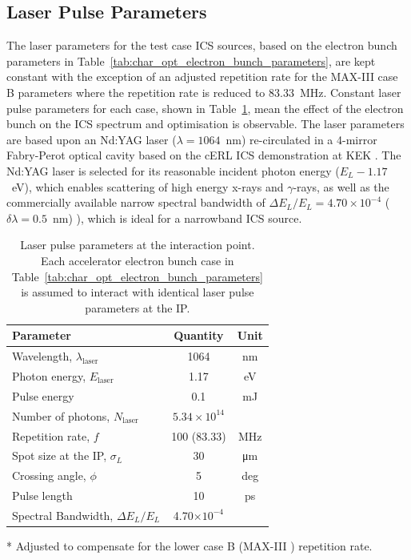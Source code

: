 \documentclass[../main.tex]{subfiles}
\begin{document}
\subsection{Laser Pulse Parameters}

The laser parameters for the test case ICS sources, based on the electron bunch parameters in Table~\ref{tab:char_opt_electron_bunch_parameters}, are kept constant with the exception of an adjusted repetition rate for the MAX-III case B parameters where the repetition rate is reduced to 83.33~\si{\mega\hertz}. Constant laser pulse parameters for each case, shown in Table~\ref{tab:char_opt_laser_pulse_parameters}, mean the effect of the electron bunch on the ICS spectrum and optimisation is observable. The laser parameters are based upon an Nd:YAG laser ($\lambda = 1064$~\si{\nano\meter}) re-circulated in a 4-mirror Fabry-Perot optical cavity based on the cERL ICS demonstration at KEK \cite{akagi2016narrow}. The Nd:YAG laser is selected for its reasonable incident photon energy ($E_{L}-1.17$~\si{\electronvolt}), which enables scattering of high energy x-rays and $\gamma$-rays, as well as the commercially available narrow spectral bandwidth of $\Delta E_{L}/E_{L} = 4.70\times 10^{-4}$  ($\delta\lambda = 0.5$~\si{\nano\meter}) \cite{thorlabs2021ndyag200}), which is ideal for a narrowband ICS source.

\begin{table}[!h]
\centering
\caption{Laser pulse parameters at the interaction point. Each accelerator electron bunch case in Table~\ref{tab:char_opt_electron_bunch_parameters} is assumed to interact with identical laser pulse parameters at the IP.}
\vspace{3mm}
\begin{threeparttable}
\begin{tabular}{lcc}
\hline\hline
Parameter & Quantity & Unit \\
\hline
Wavelength, $\lambda_\textrm{laser}$ & 1064 & nm\\
Photon energy, $E_\textrm{laser}$ & 1.17 & eV\\
Pulse energy  & 0.1 & \si{\milli\joule}\\
Number of photons, $N_{\textrm{laser}}$ & $5.34\times 10^{14}$\\ 
Repetition rate, $f$ & 100 (83.33)\tnote{*} & MHz\\
Spot size at the IP, $\sigma_{L}$ & 30 & \si{\micro\meter}\\
Crossing angle, $\phi$ & 5 & deg \\
Pulse length  & 10 & ps\\
Spectral Bandwidth, $\Delta E_{L}/E_{L}$ & 4.70$\times 10^{-4}$ &   \\
\hline\hline
\end{tabular}
\begin{tablenotes}
\item[*]{Adjusted to compensate for the lower case B (MAX-III \cite{sjostrom2009max,rosborg2012electron}) repetition rate.}
\end{tablenotes}
\end{threeparttable}
\label{tab:char_opt_laser_pulse_parameters}
\end{table}
\end{document}
